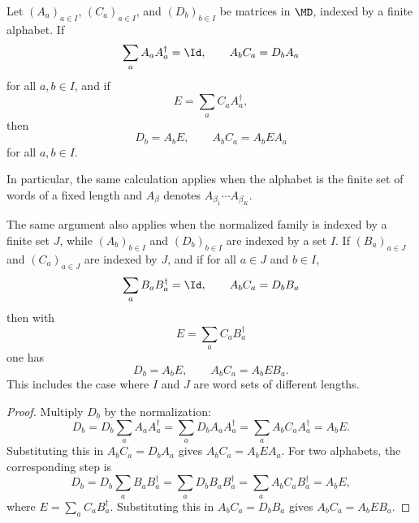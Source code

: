 \begin{lemma}
    \label{lem:normalized_boundary_matrix_identities}
    \leanok
    Let $(A_a)_{a\in I}$, $(C_a)_{a\in I}$, and $(D_b)_{b\in I}$ be matrices in
    $\MD$, indexed by a finite alphabet. If
    \[
        \sum_a A_a A_a^\dagger=\Id,
        \qquad
        A_b C_a=D_b A_a
    \]
    for all $a,b\in I$, and if
    \[
        E=\sum_a C_a A_a^\dagger,
    \]
    then
    \[
        D_b=A_bE,
        \qquad
        A_bC_a=A_bEA_a
    \]
    for all $a,b\in I$.

    In particular, the same calculation applies when the alphabet is the finite
    set of words of a fixed length and $A_\beta$ denotes
    $A_{\beta_1}\cdots A_{\beta_K}$.

    The same argument also applies when the normalized family is indexed by a
    finite set $J$, while $(A_b)_{b\in I}$ and $(D_b)_{b\in I}$ are indexed by
    a set $I$. If $(B_a)_{a\in J}$ and $(C_a)_{a\in J}$ are indexed by $J$,
    and if for all $a\in J$ and $b\in I$,
    \[
        \sum_a B_aB_a^\dagger=\Id,
        \qquad
        A_bC_a=D_bB_a
    \]
    then with
    \[
        E=\sum_a C_aB_a^\dagger
    \]
    one has
    \[
        D_b=A_bE,
        \qquad
        A_bC_a=A_bEB_a.
    \]
    This includes the case where $I$ and $J$ are word sets of different
    lengths.
\end{lemma}

\begin{proof}
    \leanok
    Multiply $D_b$ by the normalization:
    \[
        D_b
        =
        D_b\sum_a A_aA_a^\dagger
        =
        \sum_a D_bA_aA_a^\dagger
        =
        \sum_a A_bC_aA_a^\dagger
        =
        A_bE .
    \]
    Substituting this in $A_bC_a=D_bA_a$ gives
    $A_bC_a=A_bEA_a$.
    For two alphabets, the corresponding step is
    \[
        D_b
        =
        D_b\sum_a B_aB_a^\dagger
        =
        \sum_a D_bB_aB_a^\dagger
        =
        \sum_a A_bC_aB_a^\dagger
        =
        A_bE ,
    \]
    where $E=\sum_a C_aB_a^\dagger$.  Substituting this in
    $A_bC_a=D_bB_a$ gives $A_bC_a=A_bEB_a$.
\end{proof}


